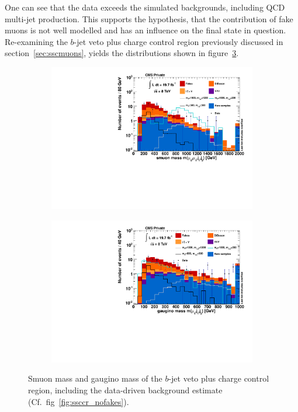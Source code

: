 One can see that the data exceeds the simulated backgrounds, including QCD multi-jet production. This supports the hypothesis, that the contribution of fake muons is not well modelled and has an influence on the final state in question. Re-examining the $b$-jet veto plus charge control region previously discussed in section~\ref{sec:sscmuons}, yields the distributions shown in figure~\ref{fig:CRBVC}.

\begin{figure}[hb!]
  \centering
  \begin{subfigure}[b]{0.495\textwidth}
    \centering
    \includegraphics[width=\textwidth]{plots/CR6_m_smuon.pdf}
    \caption{\label{fig:CRBVC_m_smuon}}
  \end{subfigure}
  \begin{subfigure}[b]{0.495\textwidth}
    \centering
    \includegraphics[width=\textwidth]{plots/CR6_m_gaugino.pdf}
    \caption{\label{fig:CRBVC_m_gaugino}}
  \end{subfigure}

  \caption{Smuon mass and gaugino mass of the $b$-jet veto plus charge control region, including the data-driven background estimate (Cf.~fig~\ref{fig:ssccr_nofakes}).}
  \label{fig:CRBVC}
\end{figure}

